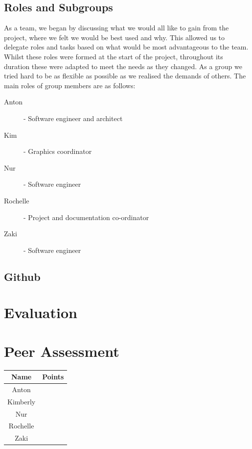 \documentclass{article}
\begin{document}
	
	\subsection{Roles and Subgroups}
	
	As a team, we began by discussing what we would all like to gain from the project, where we felt we would be best used and why. 
	This allowed us to delegate roles and tasks based on what would be most advantageous to the team. 
	Whilst these roles were formed at the start of the project, throughout its duration these were adapted to meet the needs as they changed. 
	As a group we tried hard to be as flexible as possible as we realised the demands of others.
	The main roles of group members are as follows:
	
	\begin{description}
		\item [Anton] - Software engineer and architect
		\item [Kim] - Graphics coordinator
		\item [Nur] - Software engineer
		\item [Rochelle] - Project and documentation co-ordinator
		\item [Zaki] - Software engineer
	\end{description}
	
	
	\subsection{Github}
	\section{Evaluation}
	
	
	\section{Peer Assessment}
	\begin{tabular}{|c|c|}
		\hline Name & Points \\ 
		\hline Anton &  \\ 
		\hline Kimberly &  \\ 
		\hline Nur &  \\ 
		\hline Rochelle &  \\ 
		\hline  Zaki &  \\ 
		\hline 
	\end{tabular} 
	
	
	
	
	
\end{document}

